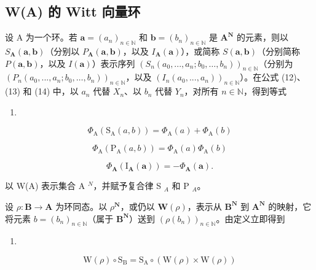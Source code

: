 \subsection{W(A) 的 Witt 向量环}

设 A 为一个环。若 \(\boldsymbol{a} = (a_n)_{n \in \mathbb{N}}\) 和 \(\boldsymbol{b} = (b_n)_{n \in \mathbb{N}}\) 是 \(\mathbf{A}^{\mathbf{N}}\) 的元素，则以 \(S_{\mathbf{A}}(\boldsymbol{a}, \boldsymbol{b})\)（分别以 \(P_{\mathbf{A}}(\boldsymbol{a}, \boldsymbol{b})\)，以及 \(I_{\mathbf{A}}(\boldsymbol{a})\)），或简称 \(S(\boldsymbol{a}, \boldsymbol{b})\)（分别简称 \(P(\boldsymbol{a}, \boldsymbol{b})\)，以及 \(I(\boldsymbol{a})\)）表示序列 \((S_n(a_0, ..., a_n; b_0, \ldots, b_n))_{n \in \mathbb{N}}\)（分别为 \((P_n(a_0, ..., a_n; b_0, \ldots, b_n))_{n \in \mathbb{N}}\)，以及 \((I_n(a_0, ..., a_n))_{n \in \mathbb{N}}\)）。在公式 (12)、(13) 和 (14) 中，以 \(a_n\) 代替 \(X_n\)、以 \(b_n\) 代替 \(Y_n\)，对所有 \(n \in \mathbb{N}\)，得到等式

\begin{enumerate}
\def\labelenumi{(\arabic{enumi})}
\setcounter{enumi}{15}
\tightlist
\item
\end{enumerate}

\[
\Phi_ {\mathrm{A}} (\mathrm{S} _ {\mathrm{A}} (a, b)) = \Phi_ {\mathrm{A}} (a) + \Phi_ {\mathrm{A}} (b)\tag{17}
\]

\[
\Phi_ {\mathrm{A}} (\mathrm{P} _ {\mathrm{A}} (a, b)) = \Phi_ {\mathrm{A}} (a) \Phi_ {\mathrm{A}} (b)\tag{18}
\]

\[
\Phi_ {\mathbf {A}} \left(\mathrm{I} _ {\mathbf {A}} (\boldsymbol {a})\right) = - \Phi_ {\mathbf {A}} (\boldsymbol {a}).
\]

以 W(A) 表示集合 A \(^{N}\)，并赋予复合律 S \(_{A}\) 和 P \(_{A}\)。

  设 \(\rho : \mathbf{B} \to \mathbf{A}\) 为环同态。以 \(\rho^{\mathbf{N}}\)，或仍以 \(\mathbf{W}(\rho)\)，表示从 \(\mathbf{B}^{\mathbf{N}}\) 到 \(\mathbf{A}^{\mathbf{N}}\) 的映射，它将元素 \(b = (b_n)_{n \in \mathbb{N}}\)（属于 \(\mathbf{B}^{\mathbf{N}}\)）送到 \((\rho(b_n))_{n \in \mathbb{N}}\)。由定义立即得到

\begin{enumerate}
\def\labelenumi{(\arabic{enumi})}
\setcounter{enumi}{18}
\tightlist
\item
\end{enumerate}

\[
\mathrm{W} (\rho) \circ \mathrm{S} _ {\mathrm{B}} = \mathrm{S} _ {\mathrm{A}} \circ (\mathrm{W} (\rho) \times \mathrm{W} (\rho))\tag{20}
\]

